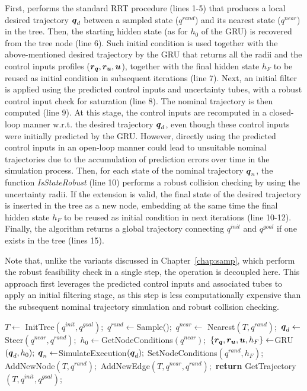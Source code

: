 First,  performs the standard RRT procedure (lines 1-5) that produces a local desired trajectory $\boldsymbol{q}_d$ between a sampled state (${q}^{rand}$) and its nearest state (${q}^{near}$) in the tree. 
Then, the starting hidden state (as for $h_{0}$ of the GRU) is recovered from the tree node (line 6).
Such initial condition is used together with the above-mentioned desired trajectory by the GRU that returns all the radii and the control inputs profiles ($\boldsymbol{r_q},\boldsymbol{r_u},\boldsymbol{u}$), together with the final hidden state $h_{F}$ to be reused as initial condition in subsequent iterations (line 7).
Next, an initial filter is applied using the predicted control inputs and uncertainty tubes, with a robust control input check for saturation (line 8).
The nominal trajectory is then computed (line 9). 
At this stage, the control inputs are recomputed in a closed-loop manner w.r.t. the desired trajectory $\boldsymbol{q}_d$, even though these control inputs were initially predicted by the GRU.
However, directly using the predicted control inputs in an open-loop manner could lead to unsuitable nominal trajectories due to the accumulation of prediction errors over time in the simulation process.
Then, for each state of the nominal trajectory $\boldsymbol{q}_{n}$, the function \emph{IsStateRobust} (line 10) performs a robust collision checking by using the uncertainty radii.
If the extension is valid, the final state of the desired trajectory is inserted in the tree as a new node, embedding at the same time the final hidden state $h_{F}$ to be reused as initial condition in next iterations (line 10-12).
Finally, the algorithm returns a global trajectory connecting ${q}^{init}$ and ${q}^{goal}$ if one exists in the tree (lines 15).

Note that, unlike the  variants discussed in Chapter~\ref{chap:samp}, which perform the robust feasibility check in a single step, the operation is decoupled here. 
This approach first leverages the predicted control inputs and associated tubes to apply an initial filtering stage, as this step is less computationally expensive than the subsequent nominal trajectory simulation and robust collision checking.

\begin{algorithm}[htp]
\caption{ [$q^{init}, q^{goal}$]}\label{alg:ExtensionExample}
\begin{algorithmic}[1]
\State $T \gets$ InitTree$({q^{init}, q^{goal}});$
    \State ${q^{rand}} \gets $Sample()$;$
    \State ${q^{near}} \gets$ Nearest$(T,{q^{rand}});$
    \State $\boldsymbol{q}_d \gets$ Steer$({q^{near}},{q^{rand}});$
    \State $h_{0} \gets $GetNodeConditions$({q^{near}});$
    \State $\left \{\boldsymbol{r_q},\boldsymbol{r_u},\boldsymbol{u}, h_{F} \right \} \gets $GRU$(\boldsymbol{q}_d,h_{0});$
        \State $\boldsymbol{q}_{n} \gets $SimulateExecution$(\boldsymbol{q}_d);$
                \State SetNodeConditions$({q^{rand}}, h_{F});$
                \State AddNewNode$(T, {q^{rand}});$
                \State AddNewEdge$(T, {q^{near}}, {q^{rand}});$
        \EndIf
    \EndIf
\EndWhile
\State \textbf{return} GetTrajectory$(T, q^{init}, q^{goal})$;
\end{algorithmic}
\end{algorithm}

